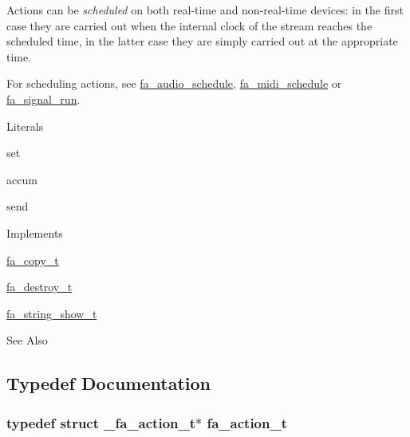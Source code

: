 Actions can be {\itshape scheduled} on both real-\/time and non-\/real-\/time devices\-: in the first case they are carried out when the internal clock of the stream reaches the scheduled time, in the latter case they are simply carried out at the appropriate time.

For scheduling actions, see \hyperlink{group___fa_audio_stream_gad98527accbfa2dcd59124577eac422bc}{fa\-\_\-audio\-\_\-schedule}, \hyperlink{group___fa_midi_ga9a269b2817ba3371d5b58493e33c0229}{fa\-\_\-midi\-\_\-schedule} or \hyperlink{group___fa_signal_gacb3351ca95bcbe1706fc5bdad9cac276}{fa\-\_\-signal\-\_\-run}.

\begin{DoxyParagraph}{Literals}

\begin{DoxyItemize}
\item {\ttfamily set}
\item {\ttfamily accum}
\item {\ttfamily send}
\end{DoxyItemize}
\end{DoxyParagraph}
\begin{DoxyParagraph}{Implements }

\begin{DoxyItemize}
\item \hyperlink{structfa__copy__t}{fa\-\_\-copy\-\_\-t}
\item \hyperlink{structfa__destroy__t}{fa\-\_\-destroy\-\_\-t}
\item \hyperlink{structfa__string__show__t}{fa\-\_\-string\-\_\-show\-\_\-t}
\end{DoxyItemize}
\end{DoxyParagraph}
\begin{DoxySeeAlso}{See Also}

\end{DoxySeeAlso}


\subsection{Typedef Documentation}
\hypertarget{group___fa_action_gadb08ae063168671e5fedc6c23f20ae4b}{
\subsubsection[{fa\-\_\-action\-\_\-t}]{\setlength{\rightskip}{0pt plus 5cm}typedef struct \-\_\-fa\-\_\-action\-\_\-t$\ast$ {\bf fa\-\_\-action\-\_\-t}}}\label{group___fa_action_gadb08ae063168671e5fedc6c23f20ae4b}


